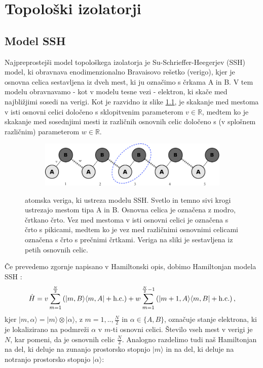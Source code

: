 \chapter{Topološki izolatorji}
\label{chMa}

\section{Model SSH}
Najpreprostejši model topološkega izolatorja je Su-Schrieffer-Heegerjev (SSH) model, ki obravnava enodimenzionalno Bravaisovo rešetko (verigo), kjer je osnovna celica sestavljena iz dveh mest, ki ju označimo s črkama A in B. V tem modelu obravnavamo - kot v modelu tesne vezi - elektron, ki skače med najbližjimi sosedi na verigi. Kot je razvidno iz slike \ref{fig:chain}, je skakanje med mestoma v isti osnovni celici določeno s sklopitvenim parameterom $v \in \mathbb{R}$, medtem ko je skakanje med sosednjimi mesti iz različnih osnovnih celic določeno s (v splošnem različnim) parameterom $w \in \mathbb{R}$.
\begin{figure}[!h]
\centering
\begin{subfigure}{.9\textwidth}
\includegraphics[width=\linewidth]{Figures/MySSHChain.pdf}
\end{subfigure}
\caption{atomska veriga, ki ustreza modelu SSH. Svetlo in temno sivi krogi ustrezajo mestom tipa A in B. Osnovna celica je označena z modro, črtkano črto. Vez med mestoma v isti osnovni celici je označena s črto s pikicami, medtem ko je vez med različnimi osnovnimi celicami označena s črto s prečnimi črtkami. Veriga na sliki je sestavljena iz petih osnovnih celic. }
\label{fig:chain}
\end{figure}
Če prevedemo zgornje napisano v Hamiltonski opis, dobimo Hamiltonjan modela SSH \cite{SSH}:
\begin{equation}
\hat{H} = v \sum_{m=1}^{\frac{N}{2}} \left( |m, B \rangle \langle m, A |  + \textup{h.c.} \right) + w \sum_{m=1}^{\frac{N}{2}-1} \left( | m+1, A \rangle \langle m, B |  + \textup{h.c.} \right),
\end{equation}
kjer $|m , \alpha \rangle = |m \rangle \otimes | \alpha \rangle$, z $m=1,.., \frac{N}{2}$ in $\alpha \in \{A,B\}$, označuje stanje elektrona, ki je lokalizirano na podmreži $\alpha$ v $m$-ti osnovni celici. Število vseh mest v verigi je $N$, kar pomeni, da je osnovnih celic $\frac{N}{2}$.  Analogno razdelimo tudi naš Hamiltonjan na del, ki deluje na zunanjo prostorsko stopnjo $|m \rangle$ in na del, ki deluje na notranjo prostorsko stopnjo $| \alpha \rangle$: 
